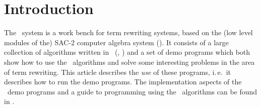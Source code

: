 \section{Introduction}
The \redux\  system is a work bench for term rewriting systems, based on 
the (low level modules of the) SAC-2 computer algebra system
(\cite{Collins:80}).
It consists of a large collection of algorithms written in \ALDES\
(\cite{Loos:76}, \cite{LoosCollins:92}) and a set of demo programs which
both show how to use
the \redux\  algorithms and solve some interesting problems in the area of
term rewriting.
This article describes the {\em use} of these programs, i.\,e.\ it
describes how to run the demo programs.
The implementation aspects of the \redux\  demo programs and 
a guide to programming
using the \redux\  algorithms can be found in \cite{RSD1.4}.

